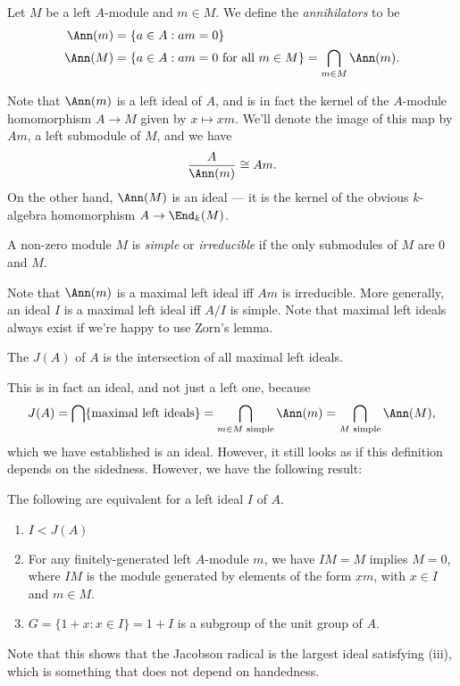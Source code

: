 \documentclass[a4paper]{article}
\begin{document}
\begin{defi}[Annihilator]
  Let $M$ be a left $A$-module and $m \in M$. We define the \emph{annihilators} to be
  \begin{align*}
    \Ann(m) &= \{a \in A: am = 0\}\\
    \Ann(M) &= \{a \in A: am = 0\text{ for all }m \in M\} = \bigcap_{m \in M} \Ann(m).
  \end{align*}
\end{defi}
Note that $\Ann(m)$ is a left ideal of $A$, and is in fact the kernel of the $A$-module homomorphism $A \to M$ given by $x \mapsto xm$. We'll denote the image of this map by $Am$, a left submodule of $M$, and we have
\[
  \frac{A}{\Ann(m)} \cong Am.
\]
On the other hand, $\Ann(M)$ is an ideal --- it is the kernel of the obvious $k$-algebra homomorphism $A \to \End_k(M)$.

\begin{defi}
  A non-zero module $M$ is \emph{simple} or \emph{irreducible} if the only submodules of $M$ are $0$ and $M$.
\end{defi}
Note that $\Ann(m)$ is a maximal left ideal iff $Am$ is irreducible. More generally, an ideal $I$ is a maximal left ideal iff $A/I$ is simple. Note that maximal left ideals always exist if we're happy to use Zorn's lemma.

\begin{defi}
  The  $J(A)$ of $A$ is the intersection of all maximal left ideals.
\end{defi}
This is in fact an ideal, and not just a left one, because
\[
  J(A) = \bigcap \{\text{maximal left ideals}\} = \bigcap_{m \in M\text{ simple}} \Ann(m) = \bigcap_{M\text{ simple}} \Ann(M),
\]
which we have established is an ideal. However, it still looks as if this definition depends on the sidedness. However, we have the following result:
\begin{lemma}
  The following are equivalent for a left ideal $I$ of $A$.
  \begin{enumerate}
    \item $I < J(A)$
    \item For any finitely-generated left $A$-module $m$, we have $IM = M$ implies $M = 0$, where $IM$ is the module generated by elements of the form $xm$, with $x \in I$ and $m \in M$.
    \item $G = \{1 + x: x \in I\} = 1 + I$ is a subgroup of the unit group of $A$.
  \end{enumerate}
\end{lemma}
Note that this shows that the Jacobson radical is the largest ideal satisfying (iii), which is something that does not depend on handedness.
\end{document}
